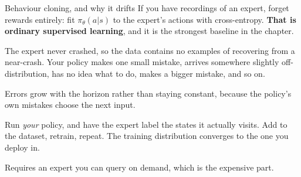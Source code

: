 \documentclass[aspectratio=169]{beamer}
\begin{document}
\begin{frame}{Behaviour cloning, and why it drifts}
  \small
  If you have recordings of an expert, forget rewards entirely: fit
  $\pi_\theta(a|s)$ to the expert's actions with cross-entropy. \textbf{That is ordinary
  supervised learning}, and it is the strongest baseline in the chapter.

  \vskip 8pt
  \begin{tcolorbox}[colback=armred!8, colframe=armred, boxrule=0.7pt, arc=2pt,
                    title={\textbf{Compounding error}}]
    \small
    The expert never crashed, so the data contains no examples of recovering from a near-crash.
    Your policy makes one small mistake, arrives somewhere slightly off-distribution, has no
    idea what to do, makes a bigger mistake, and so on.

    \vskip 4pt
    Errors grow with the horizon rather than staying constant, because the policy's own mistakes
    choose the next input.
  \end{tcolorbox}

  \vskip 6pt
  \begin{tcolorbox}[colback=paramgreen!8, colframe=paramgreen, boxrule=0.6pt, arc=2pt,
                    title={\textbf{DAgger} (Ross et al., 2011)}]
    \small
    Run \emph{your} policy, and have the expert label the states it actually visits. Add to the
    dataset, retrain, repeat. The training distribution converges to the one you deploy in.

    \vskip 3pt
    Requires an expert you can query on demand, which is the expensive part.
  \end{tcolorbox}
\end{frame}
\end{document}
